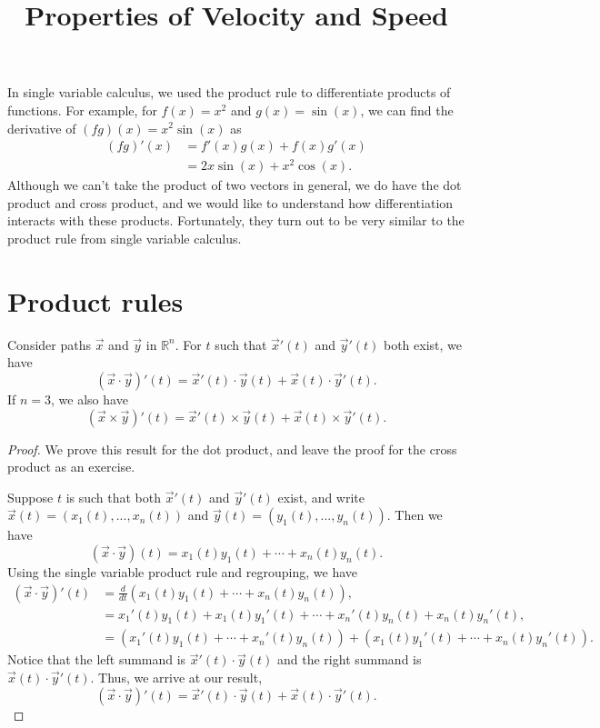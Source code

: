 \documentclass{ximera}
\title{Properties of Velocity and Speed}
\begin{document}
\begin{abstract}
\end{abstract}
\maketitle

In single variable calculus, we used the product rule to differentiate products of functions. For example, for $f(x) = x^2$ and $g(x) = \sin(x)$, we can find the derivative of $(fg)(x) = x^2\sin(x)$ as
\begin{align*}
(fg)'(x) &= f'(x)g(x)+f(x)g'(x)\\
&= 2x\sin(x)+x^2\cos(x).
\end{align*}
Although we can't take the product of two vectors in general, we do have the dot product and cross product, and we would like to understand how differentiation interacts with these products. Fortunately, they turn out to be very similar to the product rule from single variable calculus. 

\section*{Product rules}

\begin{proposition}
Consider paths $\vec{x}$ and $\vec{y}$ in $\mathbb{R}^n$. For $t$ such that $\vec{x}'(t)$ and $\vec{y}'(t)$ both exist, we have
\[
(\vec{x}\cdot\vec{y})'(t) = \vec{x}'(t)\cdot \vec{y}(t) + \vec{x}(t)\cdot \vec{y}'(t).
\]
If $n=3$, we also have
\[
(\vec{x}\times \vec{y})'(t) = \vec{x}'(t)\times \vec{y}(t) + \vec{x}(t)\times \vec{y}'(t).
\]
\end{proposition}

\begin{proof}
We prove this result for the dot product, and leave the proof for the cross product as an exercise.

Suppose $t$ is such that both $\vec{x}'(t)$ and $\vec{y}'(t)$ exist, and write $\vec{x}(t) = (x_1(t),...,x_n(t))$ and $\vec{y}(t) = (y_1(t),...,y_n(t))$. Then we have
\[
(\vec{x}\cdot\vec{y})(t) = x_1(t)y_1(t) + \cdots + x_n(t)y_n(t).
\]
Using the single variable product rule and regrouping, we have
\begin{align*}
(\vec{x}\cdot\vec{y})'(t) & = \frac{d}{dt}\left(x_1(t)y_1(t) + \cdots + x_n(t)y_n(t)\right),\\
& = x_1'(t) y_1(t) + x_1(t)y_1'(t) +\cdots+x_n'(t) y_n(t) + x_n(t)y_n'(t),\\
& = \left(x_1'(t) y_1(t) + \cdots + x_n'(t) y_n(t)\right) + \left(x_1(t) y_1'(t) + \cdots + x_n(t) y_n'(t)\right).
\end{align*}
Notice that the left summand is $\vec{x}'(t)\cdot\vec{y}(t)$ and the right summand is $\vec{x}(t)\cdot\vec{y}'(t)$. Thus, we arrive at our result,
\[
(\vec{x}\cdot\vec{y})'(t) = \vec{x}'(t)\cdot \vec{y}(t) + \vec{x}(t)\cdot \vec{y}'(t).
\]
\end{proof}
\end{document}
